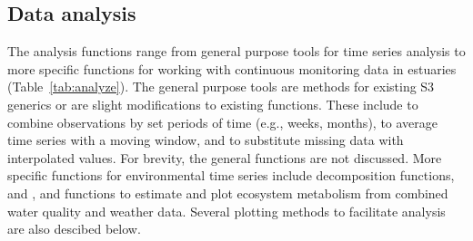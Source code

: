 \subsection{Data analysis}

The analysis functions range from general purpose tools for time series analysis to more specific functions for working with continuous monitoring data in estuaries (Table~\ref{tab:analyze}).  The general purpose tools are  methods for existing S3 generics or are slight modifications to existing functions. These include  to combine observations by set periods of time (e.g., weeks, months),  to average time series with a moving window, and  to substitute missing data with interpolated values.  For brevity, the general functions are not discussed.  More specific functions for environmental time series include decomposition functions,  and , and functions to estimate and plot ecosystem metabolism from combined water quality and weather data.  Several plotting methods to facilitate analysis are also descibed below.  

